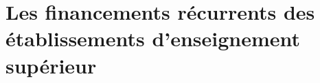 
%
%


\chapter[Les financements r\'ecurrents]{Les financements r\'ecurrents des \'etablissements d'enseignement sup\'erieur}


